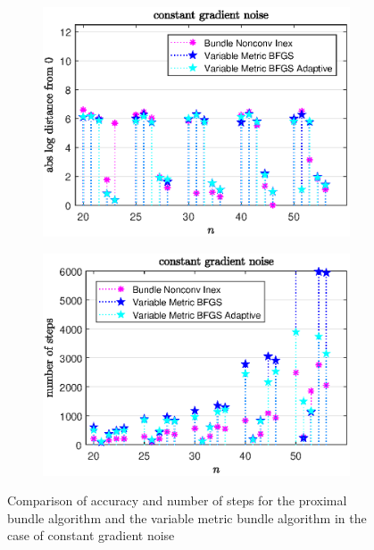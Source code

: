 \vspace{-1.5em}

\begin{figure}[H]
	\begin{subfigure}{0.49\textwidth}
		\includegraphics[width=\textwidth]{Pictures/Plots/constant_gradient_noise_b.eps}%
	\end{subfigure}
	\begin{subfigure}{0.49\textwidth}
		\includegraphics[width=\textwidth]{Pictures/Plots/steps_constant_gradient_noise_b.eps}%
	\end{subfigure}
	\caption[Accuracy and number of steps: constant gradient noise, higher dimensions]{Comparison of accuracy and number of steps for the proximal bundle algorithm and the variable metric bundle algorithm in the case of constant gradient noise}%
	\label{fig_const_grad_noise_large}%
\end{figure}

